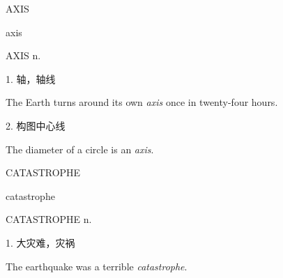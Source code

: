 \begin{flashcard}{
AXIS

axis
}
\begin{center}
AXIS n. 
\end{center}
1. 轴，轴线

The Earth turns around its own \textit{axis} once in twenty-four hours.

2. 构图中心线

The diameter of a circle is an \textit{axis}.

\end{flashcard}
\begin{flashcard}{
CATASTROPHE

catastrophe
}
\begin{center}
CATASTROPHE n. 
\end{center}
1. 大灾难，灾祸

The earthquake was a terrible \textit{catastrophe}.

\end{flashcard}
